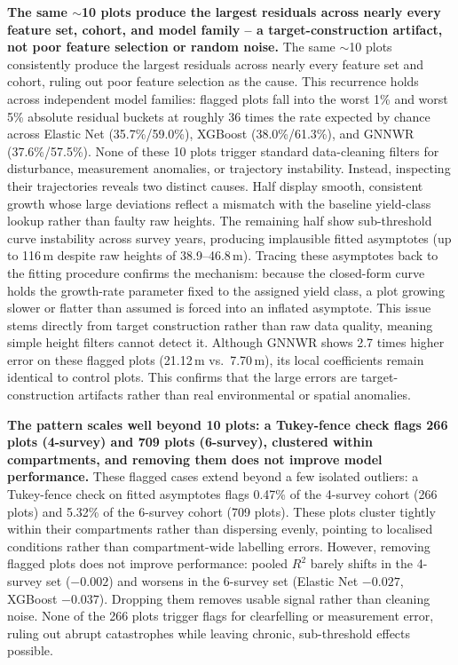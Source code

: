 \documentclass[logo,msc,ai]{infthesis}           %
\begin{document}
\textbf{The same $\sim$10 plots produce the largest residuals across nearly every feature set, cohort, and model family -- a target-construction artifact, not poor feature selection or random noise.}
The same $\sim$10 plots consistently produce the largest residuals across nearly every feature set and cohort, ruling out poor feature selection as the cause. This recurrence holds across independent model families: flagged plots fall into the worst 1\% and worst 5\% absolute residual buckets at roughly 36 times the rate expected by chance across Elastic Net (35.7\%/59.0\%), XGBoost (38.0\%/61.3\%), and GNNWR (37.6\%/57.5\%).  None of these 10 plots trigger standard data-cleaning filters for disturbance, measurement anomalies, or trajectory instability. Instead, inspecting their trajectories reveals two distinct causes. Half display smooth, consistent growth whose large deviations reflect a mismatch with the baseline yield-class lookup rather than faulty raw heights. The remaining half show sub-threshold curve instability across survey years, producing implausible fitted asymptotes (up to 116\,m despite raw heights of 38.9--46.8\,m). Tracing these asymptotes back to the fitting procedure confirms the mechanism: because the closed-form curve holds the growth-rate parameter fixed to the assigned yield class, a plot growing slower or flatter than assumed is forced into an inflated asymptote. This issue stems directly from target construction rather than raw data quality, meaning simple height filters cannot detect it. Although GNNWR shows 2.7 times higher error on these flagged plots (21.12\,m vs.\ 7.70\,m), its local coefficients remain identical to control plots. This confirms that the large errors are target-construction artifacts rather than real environmental or spatial anomalies.

\textbf{The pattern scales well beyond 10 plots: a Tukey-fence check flags 266 plots (4-survey) and 709 plots (6-survey), clustered within compartments, and removing them does not improve model performance.}
These flagged cases extend beyond a few isolated outliers: a Tukey-fence check on fitted asymptotes flags 0.47\% of the 4-survey cohort (266 plots) and 5.32\% of the 6-survey cohort (709 plots). These plots cluster tightly within their compartments rather than dispersing evenly, pointing to localised conditions rather than compartment-wide labelling errors. However, removing flagged plots does not improve performance: pooled $R^2$ barely shifts in the 4-survey set ($-0.002$) and worsens in the 6-survey set (Elastic Net $-0.027$, XGBoost $-0.037$). Dropping them removes usable signal rather than cleaning noise. None of the 266 plots trigger flags for clearfelling or measurement error, ruling out abrupt catastrophes while leaving chronic, sub-threshold effects possible.
\end{document}
